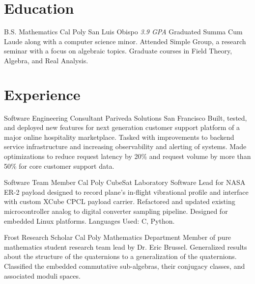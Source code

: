 \documentclass[letterpaper, 11pt, sans]{moderncv}
\begin{document}
\makecvtitle

\section{Education}
        {B.S. Mathematics}
        {Cal Poly}
        {San Luis Obispo}
        {\textit{3.9 GPA}}
        {
            Graduated Summa Cum Laude along with a computer science minor.\newline
            Attended Simple Group, a research seminar with a focus on algebraic topics.\newline
            Graduate courses in Field Theory, Algebra, and Real Analysis. \newline
        }

\section{Experience}

        {Software Engineering Consultant}
        {Pariveda Solutions}
        {San Francisco}{}
        {
            Built, tested, and deployed new features for next generation customer support platform of a major online hospitality marketplace.\newline
            Tasked with improvements to backend service infrastructure and increasing observability and alerting of systems.\newline
            Made optimizations to reduce request latency by 20\% and request volume by more than 50\% for core customer support data.\newline
        }

        {Software Team Member}
        {Cal Poly CubeSat Laboratory}{}{}
        {
            Software Lead for NASA ER-2 payload designed to record plane's in-flight vibrational profile and interface with custom XCube CPCL payload carrier.\newline
            Refactored and updated existing microcontroller analog to digital converter sampling pipeline.
            Designed for embedded Linux platforms. Languages Used: C, Python.\newline
        }

        {Frost Research Scholar}
        {Cal Poly Mathematics Department}{}{}
        {
            Member of pure mathematics student research team lead by Dr. Eric Brussel.\newline
            Generalized results about the structure of the quaternions to a generalization of the quaternions.\newline
            Classified the embedded commutative sub-algebras, their conjugacy classes, and associated moduli spaces.\newline 
        }
\end{document}
